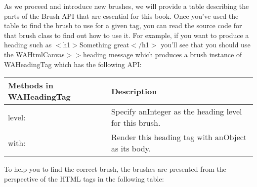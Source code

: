 \documentclass[a4paper,10pt,twoside]{book}
\newcommand{\ct}[1]{{\small\ttfamily\textup{#1}}}
\begin{document}
As we proceed and introduce new brushes, we will provide a table describing the parts of the Brush API that are essential for this book. Once you've used the table to find the brush to use for a given tag, you can read the source code for that brush class to find out how to use it. For example, if you want to produce a heading such as \ct{$<$h1$>$Something great$<$$/$h1$>$} you'll see that you should use the \ct{WAHtmlCanvas$>$$>$heading} message which produces a brush instance of \ct{WAHeadingTag} which has the following API:


\begin{tabularx}{\textwidth}{lX}
\textbf{Methods in \ct{WAHeadingTag} }&\textbf{Description}\\ \hline
 \ct{level:} & Specify \ct{anInteger} as the heading level for this brush.\\
 \ct{with:} & Render this heading tag with \ct{anObject} as its body.\\
\end{tabularx}
To help you to find the correct brush, the brushes are presented from
the perspective of the HTML tags in the following table:
\end{document}
